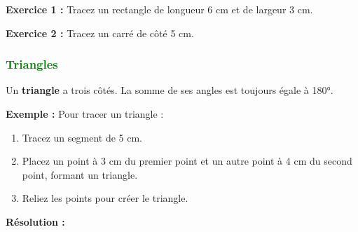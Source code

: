 \documentclass{article}
\begin{document}
\vspace{0.2cm}

\begin{tcolorbox}[colback=yellow!10!white, colframe=yellow!75!black, title=\textcolor{white}{Application directe}, sharp corners=south]
    \textbf{Exercice 1 :} Tracez un rectangle de longueur 6 cm et de largeur 3 cm.

    \textbf{Exercice 2 :} Tracez un carré de côté 5 cm.
\end{tcolorbox}

\subsubsection{\textcolor{green}{Triangles}}

\begin{tcolorbox}[colback=red!10!white, colframe=red!75!black, title=\textcolor{white}{Définitions}, sharp corners=south]
    Un \textbf{triangle} a trois côtés. La somme de ses angles est toujours égale à 180°.
\end{tcolorbox}

\vspace{0.2cm}

\begin{tcolorbox}[colback=orange!10!white, colframe=orange!75!black, title=\textcolor{white}{Exemple de traçage}, sharp corners=south]
    \textbf{Exemple :} Pour tracer un triangle :
    \begin{enumerate}
        \item Tracez un segment de 5 cm.
        \item Placez un point à 3 cm du premier point et un autre point à 4 cm du second point, formant un triangle.
        \item Reliez les points pour créer le triangle.
    \end{enumerate}
\end{tcolorbox}

\vspace{0.2cm}

\textbf{Résolution :}
\end{document}
